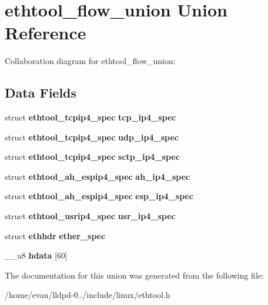 \section{ethtool\-\_\-flow\-\_\-union \-Union \-Reference}
\label{unionethtool__flow__union}


\-Collaboration diagram for ethtool\-\_\-flow\-\_\-union\-:
\subsection*{\-Data \-Fields}
\begin{DoxyCompactItemize}
\item 
struct {\bf ethtool\-\_\-tcpip4\-\_\-spec} {\bfseries tcp\-\_\-ip4\-\_\-spec}\label{unionethtool__flow__union_a8e4413d19f3f9ab2fc54b685351f2ac3}

\item 
struct {\bf ethtool\-\_\-tcpip4\-\_\-spec} {\bfseries udp\-\_\-ip4\-\_\-spec}\label{unionethtool__flow__union_a0fecd6f860b84eaba597429b29b362ab}

\item 
struct {\bf ethtool\-\_\-tcpip4\-\_\-spec} {\bfseries sctp\-\_\-ip4\-\_\-spec}\label{unionethtool__flow__union_aece39ecfc1d727640e5787260b78bd1e}

\item 
struct {\bf ethtool\-\_\-ah\-\_\-espip4\-\_\-spec} {\bfseries ah\-\_\-ip4\-\_\-spec}\label{unionethtool__flow__union_a84cc7077fda43d0e2af467a0b8b7c69a}

\item 
struct {\bf ethtool\-\_\-ah\-\_\-espip4\-\_\-spec} {\bfseries esp\-\_\-ip4\-\_\-spec}\label{unionethtool__flow__union_a1449dff3629bb6ebee0cc8d59d1c2c15}

\item 
struct {\bf ethtool\-\_\-usrip4\-\_\-spec} {\bfseries usr\-\_\-ip4\-\_\-spec}\label{unionethtool__flow__union_a8bc9e05b33445846a8e31fa1bcfb7a40}

\item 
struct {\bf ethhdr} {\bfseries ether\-\_\-spec}\label{unionethtool__flow__union_a2a1eb54c8b1f2d744b5a454bcac60160}

\item 
\-\_\-\-\_\-u8 {\bfseries hdata} [60]\label{unionethtool__flow__union_a63f03fe48d4ed3732a5e19a39c906748}

\end{DoxyCompactItemize}


\-The documentation for this union was generated from the following file\-:\begin{DoxyCompactItemize}
\item 
/home/evan/lldpd-\/0../include/linux/ethtool.\-h\end{DoxyCompactItemize}

